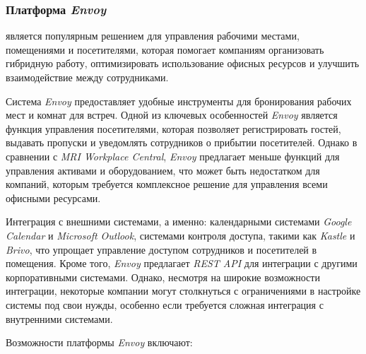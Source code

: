 \subsubsection{Платформа \textit{Envoy} }
\label{ssub:domain:solution-overview:envoy}

является популярным решением для управления рабочими местами, помещениями и посетителями, которая помогает компаниям организовать гибридную работу, оптимизировать использование офисных ресурсов и улучшить взаимодействие между сотрудниками.

Система \textit{Envoy} предоставляет удобные инструменты для бронирования рабочих мест и комнат для встреч. Одной из ключевых особенностей \textit{Envoy} является функция управления посетителями, которая позволяет регистрировать гостей, выдавать пропуски и уведомлять сотрудников о прибытии посетителей. Однако в сравнении с \textit{MRI Workplace Central}, \textit{Envoy} предлагает меньше функций для управления активами и оборудованием, что может быть недостатком для компаний, которым требуется комплексное решение для управления всеми офисными ресурсами.

Интеграция с внешними системами, а именно: календарными системами \textit{Google Calendar} и \textit{Microsoft Outlook}, системами контроля доступа, такими как \textit{Kastle} и \textit{Brivo}, что упрощает управление доступом сотрудников и посетителей в помещения. Кроме того, \textit{Envoy} предлагает \textit{REST API} для интеграции с другими корпоративными системами. Однако, несмотря на широкие возможности интеграции, некоторые компании могут столкнуться с ограничениями в настройке системы под свои нужды, особенно если требуется сложная интеграция с внутренними системами.

Возможности платформы \textit{Envoy} включают:

